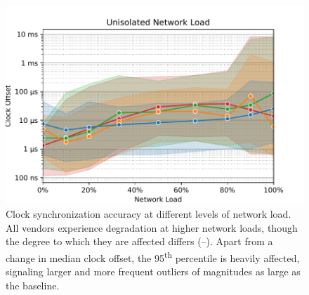 \begin{figure}
    \centering
    \includegraphics[width=\linewidth]{res/generated/net_unprioritized_trend_rpi-4.pdf}
    \legend
    \caption{Clock synchronization accuracy at different levels of network load. All vendors experience degradation at higher network loads, though the degree to which they are affected differs (\fRatio{\cmpMin}--\fRatio{\cmpMax}). Apart from a change in median clock offset, the 95\textsuperscript{th} percentile is heavily affected, signaling larger and more frequent outliers of magnitudes \fRatio[-1]{\cmpMax} as large as the baseline.}
    \label{fig:network_load}
\end{figure}


